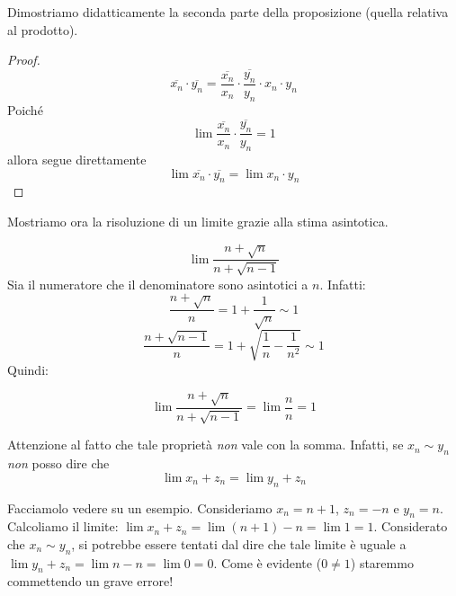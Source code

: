 Dimostriamo didatticamente la seconda parte della proposizione (quella relativa al prodotto).

\begin{proof}
\begin{equation*}
\overline{x_n} \cdot \overline{y_n} = \frac{\overline{x_n}}{x_n} \cdot \frac{\overline{y_n}}{y_n} \cdot x_n \cdot y_n
\end{equation*}
Poiché
\begin{equation*}
\lim \frac{\overline{x_n}}{x_n} \cdot \frac{\overline{y_n}}{y_n} = 1
\end{equation*}
allora segue direttamente
\begin{equation*}
\lim \overline{x_n} \cdot \overline{y_n} = \lim x_n \cdot y_n
\end{equation*}
\end{proof}

Mostriamo ora la risoluzione di un limite grazie alla stima asintotica.

\begin{example}
\begin{equation*}
\lim \frac{n + \sqrt{n}}{n + \sqrt{n-1}}
\end{equation*}
Sia il numeratore che il denominatore sono asintotici a $n$. Infatti:
\begin{equation*}
\frac{n + \sqrt{n}}{n} = 1 + \frac{1}{\sqrt{n}} \sim 1
\end{equation*}
\begin{equation*}
\frac{n + \sqrt{n-1}}{n} = 1 + \sqrt{\frac{1}{n} - \frac{1}{n^2}} \sim 1
\end{equation*}
Quindi:

\begin{equation*}
\lim \frac{n + \sqrt{n}}{n + \sqrt{n-1}} = \lim \frac{n}{n} = 1
\end{equation*}
\end{example}

\begin{remark}
Attenzione al fatto che tale proprietà \emph{non} vale con la somma. Infatti, se $x_n \sim y_n$ \emph{non} posso dire che 
\begin{equation*}
\lim x_n + z_n  = \lim y_n + z_n
\end{equation*}
\end{remark}

Facciamolo vedere su un esempio. Consideriamo $x_n = n + 1$, $z_n = -n$ e $y_n = n$. Calcoliamo il limite: $\lim x_n + z_n = \lim (n + 1) - n = \lim 1 = 1$. Considerato che $x_n \sim y_n$, si potrebbe essere tentati dal dire che tale limite è uguale a $\lim y_n + z_n = \lim n - n = \lim 0 = 0$. Come è evidente ($0 \neq 1$) staremmo commettendo un grave errore!
